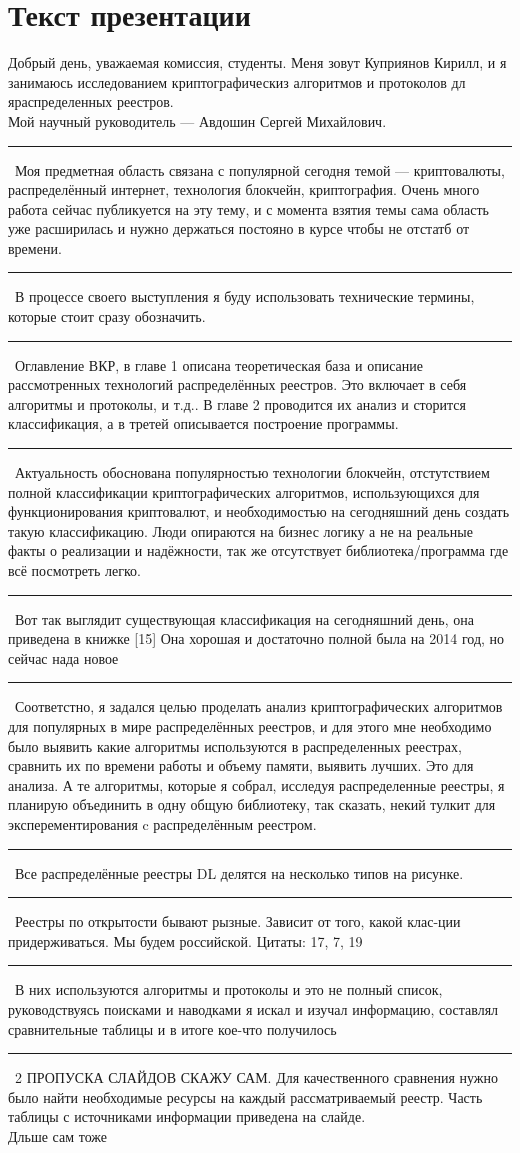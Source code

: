 \documentclass[12pt]{article}
\renewcommand{\line}{\noindent\rule{\textwidth}{1pt}}
\begin{document}
\section*{Текст презентации}

Добрый день, уважаемая комиссия, студенты. Меня зовут Куприянов Кирилл, и я
занимаюсь исследованием криптографическиз алгоритмов и протоколов дл
яраспределенных реестров.\\ Мой научный руководитель --- Авдошин Сергей
Михайлович.\\
\line\
Моя предметная область связана с популярной сегодня темой --- криптовалюты,
распределённый интернет, технология блокчейн, криптография. Очень много работа сейчас публикуется на эту тему, и с момента взятия темы сама область уже расширилась и нужно держаться постояно в курсе чтобы не отстатб от времени.\\
\line\
В процессе своего выступления я буду использовать технические термины,
которые стоит сразу обозначить.\\
\line\
Оглавление ВКР, в главе 1 описана теоретическая база и описание рассмотренных технологий распределённых реестров. Это включает в себя алгоритмы и протоколы, и т.д..
В главе 2 проводится их анализ и сторится классификация, а в третей описывается построение программы.\\
\line\
Актуальность обоснована популярностью технологии блокчейн, отстутствием полной
классификации криптографических алгоритмов, использующихся для функционирования
криптовалют, и необходимостью на сегодняшний день создать такую
классификацию. Люди опираются на бизнес логику а не на реальные факты о реализации и надёжности, так же отсутствует библиотека/программа где всё посмотреть легко.\\
\line\
Вот так выглядит существующая классификация на сегодняшний день, она приведена в книжке [15] Она хорошая и достаточно полной была на 2014 год, но сейчас нада новое\\
\line\
Соответстно, я задался целью проделать анализ криптографических алгоритмов для
популярных в мире распределённых реестров, и для этого мне необходимо было
выявить какие алгоритмы используются в распределенных реестрах, сравнить их по
времени работы и объему памяти, выявить лучших. Это для анализа. А те
алгоритмы, которые я собрал, исследуя распределенные реестры, я планирую
объединить в одну общую библиотеку, так сказать, некий тулкит для
эксперементирования c распределённым реестром.\\
\line\
Все распределённые реестры DL делятся на несколько типов на рисунке.\\
\line\
Реестры по открытости бывают рызные. Зависит от того, какой клас-ции
придерживаться. Мы будем российской. Цитаты: 17, 7, 19\\
\line\
В них используются алгоритмы и протоколы и это не полный список, руководствуясь
поисками и наводками я искал и изучал информацию, составлял сравнительные
таблицы и в итоге кое-что получилось\\
\line\
2 ПРОПУСКА СЛАЙДОВ СКАЖУ САМ. Для качественного сравнения нужно было найти
необходимые ресурсы на каждый рассматриваемый реестр. Часть таблицы с
источниками информации приведена на слайде.\\ Дльше сам тоже
\end{document}
